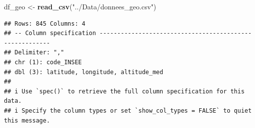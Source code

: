 \documentclass[
]{article}
\newenvironment{Shaded}{\begin{snugshade}}{\end{snugshade}}
\newcommand{\FunctionTok}[1]{\textcolor[rgb]{0.13,0.29,0.53}{\textbf{#1}}}
\newcommand{\NormalTok}[1]{#1}
\newcommand{\OtherTok}[1]{\textcolor[rgb]{0.56,0.35,0.01}{#1}}
\newcommand{\StringTok}[1]{\textcolor[rgb]{0.31,0.60,0.02}{#1}}
\begin{document}
\begin{Shaded}
\begin{Highlighting}[]
\NormalTok{df\_geo }\OtherTok{\textless{}{-}} \FunctionTok{read\_csv}\NormalTok{(}\StringTok{"../Data/donnees\_geo.csv"}\NormalTok{)}
\end{Highlighting}
\end{Shaded}

\begin{verbatim}
## Rows: 845 Columns: 4
## -- Column specification --------------------------------------------------------
## Delimiter: ","
## chr (1): code_INSEE
## dbl (3): latitude, longitude, altitude_med
## 
## i Use `spec()` to retrieve the full column specification for this data.
## i Specify the column types or set `show_col_types = FALSE` to quiet this message.
\end{verbatim}
\end{document}
